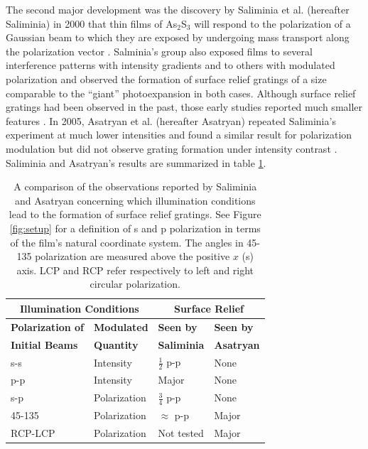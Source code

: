 \documentclass[twocolumn,showpacs,preprintnumbers,amsmath,amssymb]{revtex4}
\begin{document}
The second major development was the discovery by Saliminia et al. (hereafter Saliminia)
in 2000 that thin films of As$_{2}$S$_{3}$ will respond to the polarization of a Gaussian
beam to which they are exposed by undergoing mass transport along the polarization vector
\cite{saliminia}. Salminia's group also exposed films to several interference patterns
with intensity gradients and to others with modulated polarization and observed the
formation of surface relief gratings of a size comparable to the ``giant'' photoexpansion
in both cases. Although surface relief gratings had been observed in the past, those
early studies reported much smaller features \cite{galstyan}. In 2005, Asatryan et al.
(hereafter Asatryan) repeated Saliminia's experiment at much lower intensities and found
a similar result for polarization modulation but did not observe grating formation under
intensity contrast \cite{asatryan05}. Saliminia and Asatryan's results are summarized in
table \ref{tab:comparison}.

\begin{table}
\begin{ruledtabular}
\begin{tabular}{l l l l }
\multicolumn{2}{c}{\textbf{Illumination Conditions}}&\multicolumn{2}{c}{\textbf{Surface Relief}}\\
\hline
\textbf{Polarization of}&\textbf{Modulated}&\textbf{Seen by}&\textbf{Seen by}\\
\textbf{Initial Beams}& \textbf{Quantity}&\textbf{Saliminia}&\textbf{Asatryan}\\
\hline
s-s &Intensity&$\frac{1}{2}$ p-p    &   None\\
p-p &Intensity&Major    &   None\\
s-p&Polarization&$\frac{3}{4}$ p-p&None\\
45-135&Polarization&$\approx$ p-p&Major\\
RCP-LCP&Polarization&Not tested&Major\\
\end{tabular}
\end{ruledtabular}
\caption{A comparison of the observations reported by Saliminia and Asatryan concerning
which illumination conditions lead to the formation of surface relief gratings. See
Figure \ref{fig:setup} for a definition of s and p polarization in terms of the film's
natural coordinate system. The angles in 45-135 polarization are measured above the
positive $x$ (s) axis. LCP and RCP refer respectively to left and right circular
polarization.} \label{tab:comparison}
\end{table}
\end{document}
